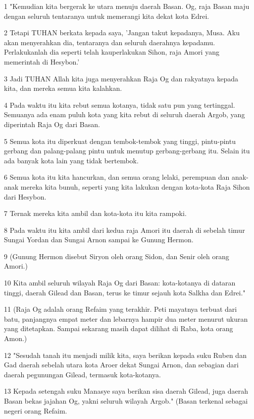 \par 1 "Kemudian kita bergerak ke utara menuju daerah Basan. Og, raja Basan maju dengan seluruh tentaranya untuk memerangi kita dekat kota Edrei.
\par 2 Tetapi TUHAN berkata kepada saya, 'Jangan takut kepadanya, Musa. Aku akan menyerahkan dia, tentaranya dan seluruh daerahnya kepadamu. Perlakukanlah dia seperti telah kauperlakukan Sihon, raja Amori yang memerintah di Hesybon.'
\par 3 Jadi TUHAN Allah kita juga menyerahkan Raja Og dan rakyatnya kepada kita, dan mereka semua kita kalahkan.
\par 4 Pada waktu itu kita rebut semua kotanya, tidak satu pun yang tertinggal. Semuanya ada enam puluh kota yang kita rebut di seluruh daerah Argob, yang diperintah Raja Og dari Basan.
\par 5 Semua kota itu diperkuat dengan tembok-tembok yang tinggi, pintu-pintu gerbang dan palang-palang pintu untuk menutup gerbang-gerbang itu. Selain itu ada banyak kota lain yang tidak bertembok.
\par 6 Semua kota itu kita hancurkan, dan semua orang lelaki, perempuan dan anak-anak mereka kita bunuh, seperti yang kita lakukan dengan kota-kota Raja Sihon dari Hesybon.
\par 7 Ternak mereka kita ambil dan kota-kota itu kita rampoki.
\par 8 Pada waktu itu kita ambil dari kedua raja Amori itu daerah di sebelah timur Sungai Yordan dan Sungai Arnon sampai ke Gunung Hermon.
\par 9 (Gunung Hermon disebut Siryon oleh orang Sidon, dan Senir oleh orang Amori.)
\par 10 Kita ambil seluruh wilayah Raja Og dari Basan: kota-kotanya di dataran tinggi, daerah Gilead dan Basan, terus ke timur sejauh kota Salkha dan Edrei."
\par 11 (Raja Og adalah orang Refaim yang terakhir. Peti mayatnya terbuat dari batu, panjangnya empat meter dan lebarnya hampir dua meter menurut ukuran yang ditetapkan. Sampai sekarang masih dapat dilihat di Raba, kota orang Amon.)
\par 12 "Sesudah tanah itu menjadi milik kita, saya berikan kepada suku Ruben dan Gad daerah sebelah utara kota Aroer dekat Sungai Arnon, dan sebagian dari daerah pegunungan Gilead, termasuk kota-kotanya.
\par 13 Kepada setengah suku Manasye saya berikan sisa daerah Gilead, juga daerah Basan bekas jajahan Og, yakni seluruh wilayah Argob." (Basan terkenal sebagai negeri orang Refaim.
